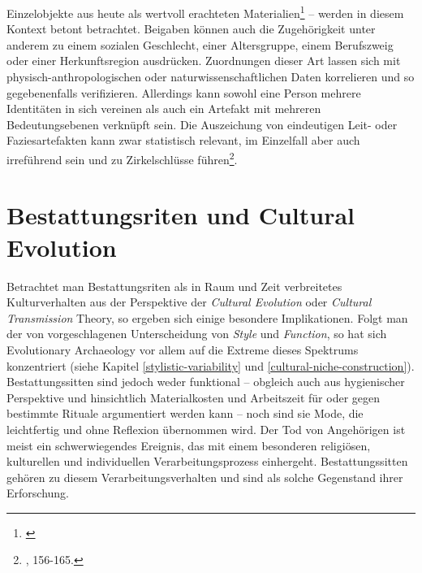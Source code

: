 \documentclass[openany,twoside,twocolumn]{book}
\let\rmarkdownfootnote\footnote%
\def\footnote{\protect\rmarkdownfootnote}
\begin{document}
Einzelobjekte aus heute als wertvoll erachteten Materialien\footnote{\textcite{bernbeck_prestige_1996}}
-- werden in diesem Kontext betont betrachtet. Beigaben können auch die
Zugehörigkeit unter anderem zu einem sozialen Geschlecht, einer
Altersgruppe, einem Berufszweig oder einer Herkunftsregion ausdrücken.
Zuordnungen dieser Art lassen sich mit physisch-anthropologischen oder
naturwissenschaftlichen Daten korrelieren und so gegebenenfalls
verifizieren. Allerdings kann sowohl eine Person mehrere Identitäten in
sich vereinen als auch ein Artefakt mit mehreren Bedeutungsebenen
verknüpft sein. Die Auszeichung von eindeutigen Leit- oder
Faziesartefakten kann zwar statistisch relevant, im Einzelfall aber auch
irreführend sein und zu Zirkelschlüsse führen\footnote{\textcite{hofmann_rituelle_2008},
  156-165.}.

\hypertarget{bestattungsriten-und-cultural-evolution}{%
\section{Bestattungsriten und Cultural
Evolution}\label{bestattungsriten-und-cultural-evolution}}

Betrachtet man Bestattungsriten als in Raum und Zeit verbreitetes
Kulturverhalten aus der Perspektive der \emph{Cultural Evolution} oder
\emph{Cultural Transmission} Theory, so ergeben sich einige besondere
Implikationen. Folgt man der von \textcite{dunnell1978style}
vorgeschlagenen Unterscheidung von \emph{Style} und \emph{Function}, so
hat sich Evolutionary Archaeology vor allem auf die Extreme dieses
Spektrums konzentriert (siehe Kapitel \ref{stylistic-variability} und
\ref{cultural-niche-construction}). Bestattungssitten sind jedoch weder
funktional -- obgleich auch aus hygienischer Perspektive und
hinsichtlich Materialkosten und Arbeitszeit für oder gegen bestimmte
Rituale argumentiert werden kann -- noch sind sie Mode, die leichtfertig
und ohne Reflexion übernommen wird. Der Tod von Angehörigen ist meist
ein schwerwiegendes Ereignis, das mit einem besonderen religiösen,
kulturellen und individuellen Verarbeitungsprozess einhergeht.
Bestattungssitten gehören zu diesem Verarbeitungsverhalten und sind als
solche Gegenstand ihrer Erforschung.
\end{document}
